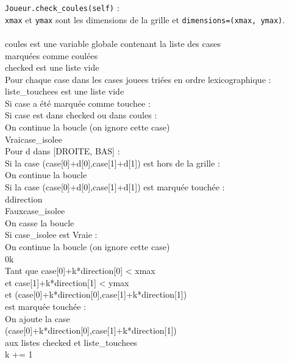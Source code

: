 {
\begin{frame}[allowframebreaks]
\texttt{Joueur.check\_coules(self)} :\\
\texttt{xmax} et \texttt{ymax} sont les dimensions de la grille et \texttt{dimensions=(xmax, ymax)}.\\~\\
coules est une variable globale contenant la liste des cases\\
 marquées comme coulées\\
checked est une liste vide\\
Pour chaque case dans les cases jouees triées en ordre lexicographique :\\
liste\_touchees est une liste vide\\
Si case a été marquée comme touchee :\\
Si case est dans checked ou dans coules :\\
On continue la boucle (on ignore cette case)\\
Vrai\sto case\_isolee\\
\framebreak
{}Pour d dans [DROITE, BAS] :\\
Si la case (case[0]+d[0],case[1]+d[1]) est hors de la grille :\\
On continue la boucle\\
Si la case (case[0]+d[0],case[1]+d[1]) est marquée touchée :\\
d\sto direction\\
Faux\sto case\_isolee\\
On casse la boucle\\
Si case\_isolee est Vraie :\\
On continue la boucle (on ignore cette case)\\
\framebreak
{}0\sto k\\
Tant que case[0]+k*direction[0] < xmax\\
et case[1]+k*direction[1] < ymax\\
et (case[0]+k*direction[0],case[1]+k*direction[1])\\
 est marquée touchée :\\
On ajoute la case\\
 (case[0]+k*direction[0],case[1]+k*direction[1])\\
aux listes checked et liste\_touchees\\
k += 1\\

\end{frame}}
